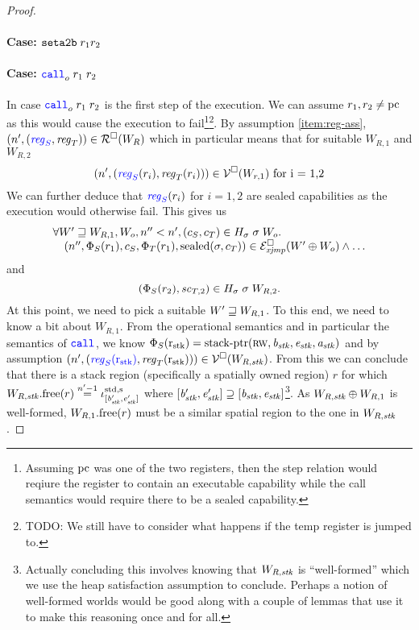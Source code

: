 \documentclass[a4paper]{article}
\begin{document}
\begin{proof}
\paragraph{Case: $\protect\tsetatob{\trg{r_1}}{\trg{r_2}}$}

\paragraph{Case: $\scall[o]{}{r_1}{r_2}$}
In case $\scall[o]{}{r_1}{r_2}$ is the first step of the execution. We can assume $r_1,r_2 \neq \pcreg$ as this would cause the execution to fail\footnote{Assuming $\pcreg$ was one of the two registers, then the step relation would reqiure the register to contain an executable capability while the call semantics would require there to be a sealed capability.}\footnote{{\color{red} TODO:} We still have to consider what happens if the temp register is jumped to.}. By assumption \ref{item:reg-ass}, $\npair[n']{\stpair{\reg}{\reg}} \in \lrr(W_R)$ which in particular means that for suitable $W_{R,1}$ and $W_{R,2}$
\[
  \npair[n']{(\src{\reg_S}(r_i),\reg_T(r_i))} \in \lrv(W_{r,1}) \text{ for i = 1,2}
\]
We can further deduce that $\src{\reg_S}(r_i)$ for $i=1,2$ are sealed capabilities as the execution would otherwise fail. This gives us
\[
  \begin{array}{l}
    \forall W' \future W_{R,1}, W_o, n'' < n', (c_S,c_T) \in H_\sigma \; \sigma \; W_o \ldotp \\
    \quad \npair[n'']{\Phi_S(r_1),c_S,\Phi_T(r_1),\sealed{\sigma,c_T}} \in \lrexj(W' \oplus W_o) \wedge \dots
  \end{array}
\]
and
\[
  (\Phi_S(r_2), \vsc_{T,2}) \in H_\sigma \; \sigma \; W_{R,2}.
\]
At this point, we need to pick a suitable $W' \future W_{R,1}$. To this end, we need to know a bit about $W_{R,1}$. From the operational semantics and in particular the semantics of $\scall{}{}{}{}$, we know $\Phi_S(\rstk) = \stkptr{\rw,\baddr_\stk,\eaddr_\stk,\aaddr_\stk}$ and by assumption $\npair[n']{(\src{\reg_S(\rstk)},\trg{\reg_T(\rstk)})} \in \lrv(W_{R,\stk})$. From this we can conclude that there is a stack region (specifically a spatially owned region) $r$ for which $\pwfree[W_{R,\stk}](r) \nequal[n'-1] \stdreg{[\baddr_\stk',\eaddr_\stk']}{\spa}$ where $[\baddr_\stk',\eaddr_\stk'] \supseteq [\baddr_\stk,\eaddr_\stk]$\footnote{Actually concluding this involves knowing that $W_{R,\stk}$ is ``well-formed'' which we use the heap satisfaction assumption to conclude. Perhaps a notion of well-formed worlds would be good along with a couple of lemmas that use it to make this reasoning once and for all.}. As $W_{R,\stk} \oplus W_{R,1}$ is well-formed, $\pwfree[W_{R,1}](r)$ must be a similar spatial region to the one in $W_{R,\stk}$.

\end{proof}
\end{document}
